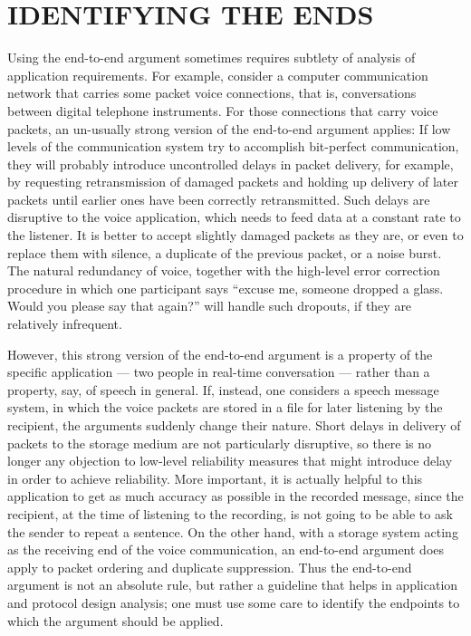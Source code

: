 \documentclass[a4paper,11pt,notitlepage,twoside,openright]{article}
\begin{document}
\hypertarget{identifying-the-ends}{%
\section{IDENTIFYING THE ENDS}\label{identifying-the-ends}}

Using the end-to-end argument sometimes requires subtlety of analysis of
application requirements. For example, consider a computer
communication network that carries some packet voice connections, that
is, conversations between digital telephone instruments. For those
connections that carry voice packets, an un-usually strong version of
the end-to-end argument applies: If low levels of the communication
system try to accomplish bit-perfect communication, they will probably
introduce uncontrolled delays in packet delivery, for example, by requesting retransmission of damaged packets and holding up delivery of
later packets until earlier ones have been correctly retransmitted. Such
delays are disruptive to the voice application, which needs to feed data
at a constant rate to the listener. It is better to accept slightly
damaged packets as they are, or even to replace them with silence, a
duplicate of the previous packet, or a noise burst. The natural
redundancy of voice, together with the high-level error correction
procedure in which one participant says ``excuse me, someone dropped a
glass. Would you please say that again?'' will handle such dropouts, if
they are relatively infrequent.

However, this strong version of the end-to-end argument is a property of
the specific application --- two people in real-time conversation ---
rather than a property, say, of speech in general. If, instead, one
considers a speech message system, in which the voice packets are stored
in a file for later listening by the recipient, the arguments suddenly
change their nature. Short delays in delivery of packets to the storage
medium are not particularly disruptive, so there is no longer any
objection to low-level reliability measures that might introduce delay
in order to achieve reliability. More important, it is actually helpful
to this application to get as much accuracy as possible in the recorded
message, since the recipient, at the time of listening to the recording,
is not going to be able to ask the sender to repeat a sentence. On the
other hand, with a storage system acting as the receiving end of the
voice communication, an end-to-end argument does apply to packet
ordering and duplicate suppression. Thus the end-to-end argument is not
an absolute rule, but rather a guideline that helps in application and
protocol design analysis; one must use some care to identify the
endpoints to which the argument should be applied.
\end{document}

